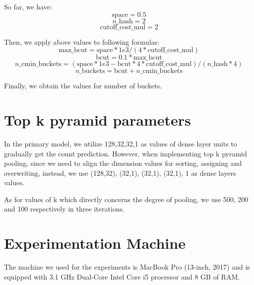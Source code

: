 So far, we have:
\[ \text{space} = 0.5 \]
\[ n\_\text{hash} = 2 \]
\[ \text{cutoff}\_\text{cost}\_\text{mul} = 2 \]

Then, we apply above values to following formulas:
\[ \text{max}\_\text{bcut} = \text{space} * 1e3 / (4 * \text{cutoff}\_\text{cost}\_\text{mul}) \]
\[ \text{bcut} = 0.1 * \text{max}\_\text{bcut} \]
\[ n\_\text{cmin}\_\text{buckets} = (\text{space} * 1e3 - \text{bcut} * 4 * \text{cutoff}\_\text{cost}\_\text{mul}) / (n\_\text{hash} * 4) \]
\[ n\_\text{buckets} = \text{bcut} + n\_\text{cmin}\_\text{buckets} \]

Finally, we obtain the values for number of buckets.

\section{Top k pyramid parameters}

In the primary model, we utilize {128,32,32,1} as values of dense layer units to gradually get the count prediction. However, when implementing top k pyramid pooling, since we need to align the dimension values for sorting, assigning and overwriting, instead, we use {(128,32), (32,1), (32,1), (32,1), 1} as dense layers values.

As for values of k which directly concerns the degree of pooling, we use 500, 200 and 100 respectively in three  iterations.

\section{Experimentation Machine}
The machine we used for the experiments is MacBook Pro (13-inch, 2017) and is equipped with 3.1 GHz Dual-Core Intel Core i5  processor and 8 GB of RAM. 